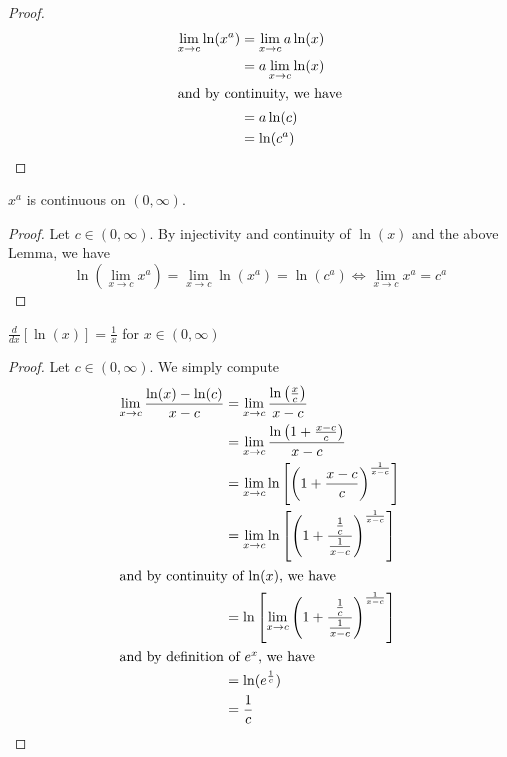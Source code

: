 \begin{enumerate}
    \begin{proof}
    \begin{align*}
        \lim_{x\rightarrow c} \ln(x^{a}) &= \lim_{x\rightarrow c} a\ln(x) \\
        &= a \lim_{x\rightarrow c} \ln(x) \\
        \intertext{and by continuity, we have}
        &= a \ln(c) \\
        &= \ln(c^{a})
    \end{align*}
    \end{proof}
    
    \begin{corollary} \( x^a \) is continuous on \( (0, \infty) \). 
    \end{corollary}
    
    \begin{proof}
    Let \( c \in (0,\infty) \). By injectivity and continuity of \( \ln(x) \) and the above Lemma, we have
    \[
    \ln(\lim_{x\rightarrow c} x^a) = \lim_{x \rightarrow c} \ln(x^a) = \ln(c^a) \iff \lim_{x\rightarrow c} x^a = c^a
    \]
    \end{proof}
    
    \begin{lemma}
    \( \frac{d}{dx}[\ln(x)] = \frac{1}{x} \) for \( x \in (0, \infty) \)
    \end{lemma}
    
    \begin{proof}
    Let \( c \in (0,\infty) \). We simply compute
    \begin{align*}
        \lim_{x \rightarrow c} \frac{\ln(x)-\ln(c)}{x-c} &= \lim_{x \rightarrow c} \frac{\ln\left( \frac{x}{c} \right)}{x-c} \\
        &= \lim_{x \rightarrow c} \frac{\ln\left( 1 + \frac{x-c}{c} \right)}{x-c} \\
        &= \lim_{x \rightarrow c} \ln\left[ \left( 1+ \frac{x-c}{c} \right)^{\frac{1}{x-c}} \right] \\
        &= \lim_{x \rightarrow c} \ln\left[ \left( 1 + \frac{\frac{1}{c}}{\frac{1}{x-c}} \right)^{\frac{1}{x-c}} \right] \\
        \intertext{and by continuity of \( \ln(x) \), we have}
        &=\ln\left[ \lim_{x \rightarrow c} \left( 1 + \frac{\frac{1}{c}}{\frac{1}{x-c}} \right)^{\frac{1}{x-c}} \right] \\
        \intertext{and by definition of \( e^x \), we have}
        &= \ln(e^{\frac{1}{c}}) \\
        &= \frac{1}{c}
    \end{align*}
    \end{proof}
    

\end{enumerate}
